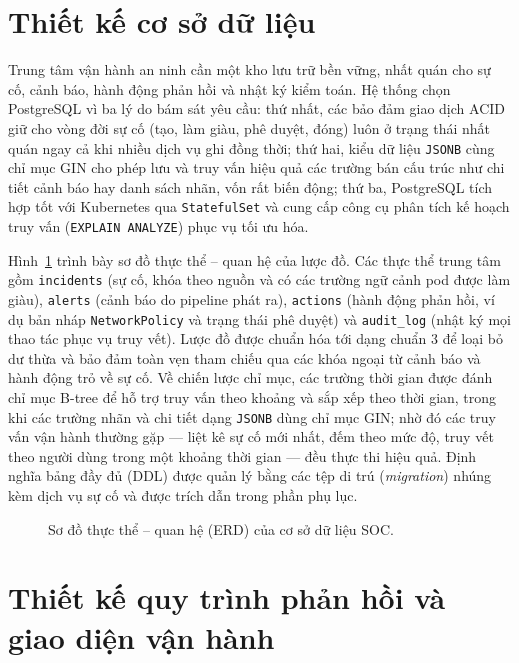 \section{Thiết kế cơ sở dữ liệu}
\label{ch:database}

Trung tâm vận hành an ninh cần một kho lưu trữ bền vững, nhất quán cho sự cố, cảnh báo,
hành động phản hồi và nhật ký kiểm toán. Hệ thống chọn PostgreSQL vì ba lý do bám sát
yêu cầu: thứ nhất, các bảo đảm giao dịch ACID giữ cho vòng đời sự cố (tạo, làm giàu,
phê duyệt, đóng) luôn ở trạng thái nhất quán ngay cả khi nhiều dịch vụ ghi đồng thời;
thứ hai, kiểu dữ liệu \texttt{JSONB} cùng chỉ mục GIN cho phép lưu và truy vấn hiệu quả
các trường bán cấu trúc như chi tiết cảnh báo hay danh sách nhãn, vốn rất biến động;
thứ ba, PostgreSQL tích hợp tốt với Kubernetes qua \texttt{StatefulSet} và cung cấp công
cụ phân tích kế hoạch truy vấn (\texttt{EXPLAIN ANALYZE}) phục vụ tối ưu hóa.

Hình~\ref{fig:erd} trình bày sơ đồ thực thể -- quan hệ của lược đồ. Các thực thể trung
tâm gồm \texttt{incidents} (sự cố, khóa theo nguồn và có các trường ngữ cảnh pod được
làm giàu), \texttt{alerts} (cảnh báo do pipeline phát ra), \texttt{actions} (hành động
phản hồi, ví dụ bản nháp \texttt{NetworkPolicy} và trạng thái phê duyệt) và
\texttt{audit\_log} (nhật ký mọi thao tác phục vụ truy vết). Lược đồ được chuẩn hóa tới
dạng chuẩn 3 để loại bỏ dư thừa và bảo đảm toàn vẹn tham chiếu qua các khóa ngoại từ
cảnh báo và hành động trỏ về sự cố. Về chiến lược chỉ mục, các trường thời gian được
đánh chỉ mục B-tree để hỗ trợ truy vấn theo khoảng và sắp xếp theo thời gian, trong khi
các trường nhãn và chi tiết dạng \texttt{JSONB} dùng chỉ mục GIN; nhờ đó các truy vấn
vận hành thường gặp --- liệt kê sự cố mới nhất, đếm theo mức độ, truy vết theo người
dùng trong một khoảng thời gian --- đều thực thi hiệu quả. Định nghĩa bảng đầy đủ (DDL)
được quản lý bằng các tệp di trú (\textit{migration}) nhúng kèm dịch vụ sự cố và được
trích dẫn trong phần phụ lục.

\begin{figure}[H]
  \centering
  \resizebox{0.95\linewidth}{!}{}
  \caption{Sơ đồ thực thể -- quan hệ (ERD) của cơ sở dữ liệu SOC.}
  \label{fig:erd}
\end{figure}

\section{Thiết kế quy trình phản hồi và giao diện vận hành}
\label{ch:ui}

